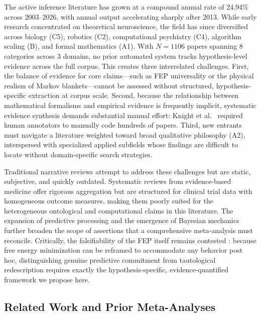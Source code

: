 \documentclass[
  english,
]{article}
\begin{document}
The active inference literature has grown at a compound annual rate of
24.94\% across 2003--2026, with annual output accelerating sharply after
2013. While early research concentrated on theoretical neuroscience, the
field has since diversified across biology (C5), robotics (C2),
computational psychiatry (C4), algorithm scaling (B), and formal
mathematics (A1). With \(N = 1106\) papers spanning 8 categories across
3 domains, no prior automated system tracks hypothesis-level evidence
across the full corpus. This creates three interrelated challenges.
First, the balance of evidence for core claims---such as FEP
universality or the physical realism of Markov blankets---cannot be
assessed without structured, hypothesis-specific extraction at corpus
scale. Second, because the relationship between mathematical formalisms
and empirical evidence is frequently implicit, systematic evidence
synthesis demands substantial manual effort: Knight et
al.~\citep{knight2022fep} required human annotators to manually code
hundreds of papers. Third, new entrants must navigate a literature
weighted toward broad qualitative philosophy (A2), interspersed with
specialized applied subfields whose findings are difficult to locate
without domain-specific search strategies.

Traditional narrative reviews attempt to address these challenges but
are static, subjective, and quickly outdated. Systematic reviews from
evidence-based medicine offer rigorous aggregation but are structured
for clinical trial data with homogeneous outcome measures, making them
poorly suited for the heterogeneous ontological and computational claims
in this literature. The expansion of predictive processing
\citep{clark2013whatever, hohwy2013predictive} and the emergence of
Bayesian mechanics \citep{sakthivadivel2023bayesian} further broaden the
scope of assertions that a comprehensive meta-analysis must reconcile.
Critically, the falsifiability of the FEP itself remains contested
\citep{colombo2021free}: because free energy minimization can be
reframed to accommodate any behavior post hoc, distinguishing genuine
predictive commitment from tautological redescription requires exactly
the hypothesis-specific, evidence-quantified framework we propose here.

\subsection{Related Work and Prior
Meta-Analyses}\label{related-work-and-prior-meta-analyses}
\end{document}
